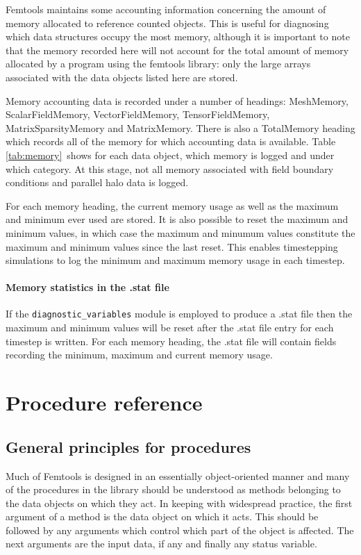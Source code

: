 \documentclass[a4paper, 11pt]{book}
\begin{document}
Femtools  maintains some accounting information concerning the amount of
memory allocated to reference counted objects. This is useful for diagnosing
which data structures occupy the most memory, although it is important to
note that the memory recorded here will not account for the total amount of
memory allocated by a program using the femtools library: only the large
arrays associated with the data objects listed here are stored.

Memory accounting data is recorded under a number of headings: MeshMemory,
ScalarFieldMemory, VectorFieldMemory, TensorFieldMemory,
MatrixSparsityMemory and MatrixMemory. There is also a TotalMemory heading
which records all of the memory for which accounting data is available.
Table \ref{tab:memory}\ shows for each data object, which memory is logged
and under which category. At this stage, not all memory associated with
field boundary conditions and parallel halo data is logged.

For each memory heading, the current memory usage as well as the maximum and
minimum ever used are stored. It is also possible to reset the maximum and
minimum values, in which case the maximum and minumum values constitute the
maximum and minimum values since the last reset. This enables timestepping
simulations to log the minimum and maximum memory usage in each timestep. 

\subsection{Memory statistics in the .stat file}

If the \lstinline+diagnostic_variables+ module is employed to produce a
.stat file then the maximum and minimum values will be reset
after the .stat file entry for each timestep is written. For each memory
heading, the .stat file will contain fields recording the minimum, maximum
and current memory usage.

\part{Procedure reference}


\chapter{General principles for procedures}

Much of Femtools is designed in an essentially object-oriented manner and
many of the procedures in the library should be understood as methods
belonging to the data objects on which they act. In keeping with widespread
practice, the first argument of a method is the data object on which it
acts. This should be followed by any arguments which control which part of
the object is affected. The next arguments are the input data, if any and
finally any status variable.
\end{document}
